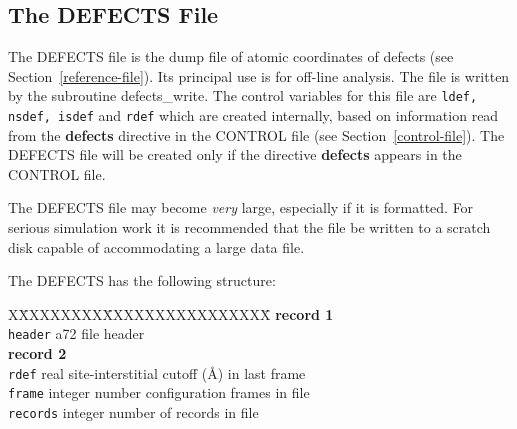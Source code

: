 \subsection{The DEFECTS File}
\label{defects-file}

The DEFECTS file is the dump file of atomic coordinates of defects
(see Section~\ref{reference-file}).  Its principal use is for
off-line analysis.  The file is written by the subroutine
{\sc defects\_write}.  The control
variables for this file are {\tt ldef, nsdef, isdef} and {\tt rdef}
which are created internally, based on information read from
the {\bf defects} directive in the CONTROL file (see Section~\ref{control-file}).
The DEFECTS file will be created only if the directive {\bf defects}
appears in the CONTROL file.

The DEFECTS file may become {\em very} large, especially if it is
formatted.  For serious simulation work it is recommended that the
file be written to a scratch disk capable of accommodating a large
data file.

The DEFECTS has the following structure:
\begin{tabbing}
X\=XXXXXXXX\=XXXXXXXXXXXXXXXX\=\kill
{\bf record 1} \\
\> {\tt header}  \> a72     \> file header \\
{\bf record 2} \\
\> {\tt rdef}    \> real    \> site-interstitial cutoff (\AA) in last frame \\
\> {\tt frame}   \> integer \> number configuration frames in file \\
\> {\tt records} \> integer \> number of records in file
\end{tabbing}

